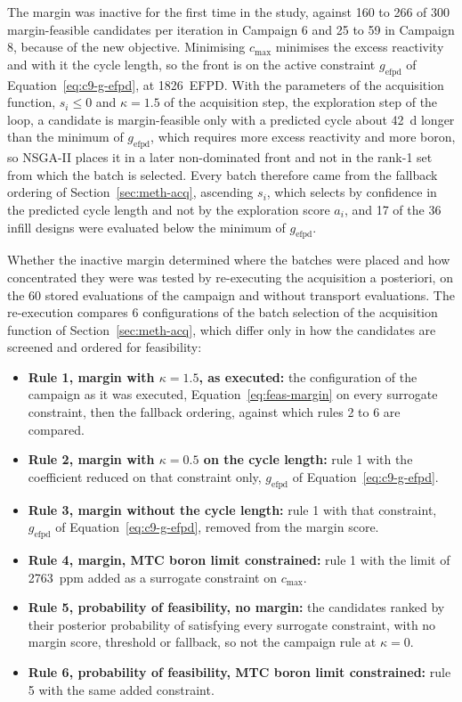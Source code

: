 The margin was inactive for the first time in the study, against 160
to 266 of 300 margin-feasible candidates per iteration in Campaign 6 and
25 to 59 in Campaign 8, because of the new objective. Minimising
$c_\mathrm{max}$ minimises the excess reactivity and with it the cycle
length, so the front is on the active constraint $g_\mathrm{efpd}$ of
Equation~\eqref{eq:c9-g-efpd}, at \SI{1826}{EFPD}. With the parameters of the acquisition function, $s_i \le 0$ and
$\kappa = 1.5$ of the acquisition step, the
exploration step of the loop, a candidate is margin-feasible only with
a predicted cycle about \SI{42}{d} longer than the minimum of
$g_\mathrm{efpd}$, which requires more excess
reactivity and more boron, so NSGA-II places it in a later
non-dominated front and not in the rank-1 set from which the batch is
selected. Every batch therefore came from the fallback ordering of
Section~\ref{sec:meth-acq}, ascending $s_i$, which selects by confidence in the predicted cycle
length and not by the exploration score $a_i$, and 17 of the 36
infill designs were evaluated below the minimum of
$g_\mathrm{efpd}$.

Whether the inactive margin determined where the batches were placed and
how concentrated they were was tested by
re-executing the acquisition a posteriori, on the 60 stored evaluations
of the campaign and without transport evaluations. The re-execution
compares 6 configurations of the batch selection of the acquisition
function of Section~\ref{sec:meth-acq}, which differ only in how the
candidates are screened and ordered for feasibility:

\begin{itemize}
    \item \textbf{Rule 1, margin with $\kappa = 1.5$, as executed:} the
        configuration of the campaign as it was executed,
        Equation~\eqref{eq:feas-margin} on every surrogate constraint,
        then the fallback ordering, against which rules 2 to 6 are
        compared.
  \item \textbf{Rule 2, margin with $\kappa = 0.5$ on the cycle length:}
        rule 1 with the coefficient reduced on that constraint only,
        $g_\mathrm{efpd}$ of Equation~\eqref{eq:c9-g-efpd}.
  \item \textbf{Rule 3, margin without the cycle length:} rule 1 with
        that constraint, $g_\mathrm{efpd}$ of
        Equation~\eqref{eq:c9-g-efpd}, removed from the margin score.
  \item \textbf{Rule 4, margin, MTC boron limit constrained:} rule 1
        with the limit of \SI{2763}{ppm} added as a surrogate constraint
        on $c_\mathrm{max}$.
  \item \textbf{Rule 5, probability of feasibility, no margin:} the
        candidates ranked by their posterior probability of satisfying
        every surrogate constraint, with no margin score, threshold or
        fallback, so not the campaign rule at $\kappa = 0$.
  \item \textbf{Rule 6, probability of feasibility, MTC boron limit
        constrained:} rule 5 with the same added constraint.
\end{itemize}

